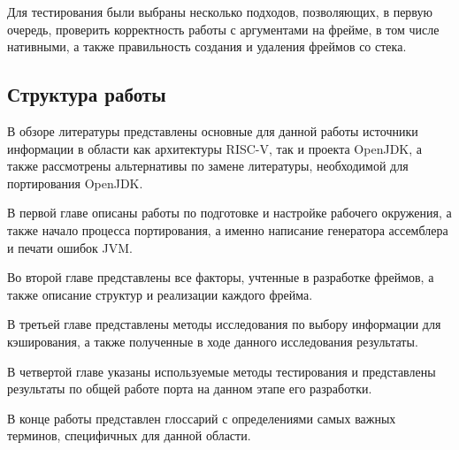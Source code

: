 Для тестирования были выбраны несколько подходов, позволяющих, в первую очередь, проверить корректность работы с аргументами на фрейме, в том числе нативными, а также правильность создания и удаления фреймов со стека.

\subsection*{Структура работы}

В обзоре литературы представлены основные для данной работы источники информации в области как архитектуры RISC-V, так и проекта OpenJDK, а также рассмотрены альтернативы по замене литературы, необходимой для портирования OpenJDK.

В первой главе описаны работы по подготовке и настройке рабочего окружения, а также начало процесса портирования, а именно написание генератора ассемблера и печати ошибок JVM.%

Во второй главе представлены все факторы, учтенные в разработке фреймов, а также описание структур и реализации каждого фрейма.

В третьей главе представлены методы исследования по выбору информации для кэширования, а также полученные в ходе данного исследования результаты. 

В четвертой главе указаны используемые методы тестирования и представлены результаты по общей работе порта на данном этапе его разработки.

В конце работы представлен глоссарий с определениями самых важных терминов, специфичных для данной области.

\renewcommand{\thefigure}{\arabic{section}.\arabic{figure}}